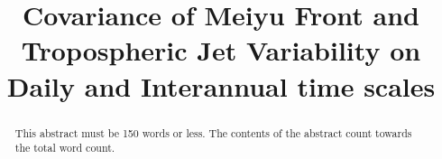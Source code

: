 \documentclass[draft,grl]{AGUTeX}
\begin{document}
%
%


\title{Covariance of Meiyu Front and Tropospheric Jet Variability on Daily and Interannual time scales}

%
%






%
%


\begin{abstract}
This abstract must be 150 words or less. The contents of the abstract count towards the total word count.
\end{abstract}

\end{document}
